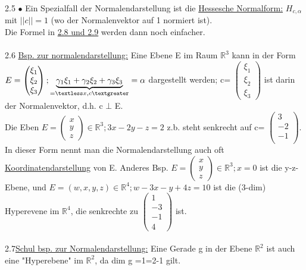 \documentclass[]{scrartcl}
\begin{document}
 2.5 $\bullet$ Ein Spezialfall der Normalendarstellung ist die \ul{Hessesche Normalform:} $H_{c,\alpha}$ mit \ul{$||c|| = 1$} (wo der Normalenvektor auf 1 normiert ist).\\
 Die Formel in  \ul{2.8 und 2.9} werden dann noch einfacher.\\\\
 2.6 \underline{Bsp. zur normalendarstellung:} Eine Ebene E im Raum $\mathbb{R}^3$ kann in der Form $E = {\begin{pmatrix} 
 		\xi_1\\
 		\xi_2\\
 		\xi_3
 \end{pmatrix}; \underbrace{\gamma_1\xi_1+\gamma_2\xi_2+\gamma_3\xi_3}_{=\textless x,c \textgreater}= \alpha}$ dargestellt werden; c= 
$\begin{pmatrix} 
	\xi_1\\
	\xi_2\\
	\xi_3
\end{pmatrix}$ ist darin der Normalenvektor, d.h. c $\bot$ E.\\
Die Eben $E = {\begin{pmatrix} 
		x\\
		y\\
		z
\end{pmatrix}\in \mathbb{R}^3; 3x-2y-z=2}$ z.b. steht senkrecht auf c= $\begin{pmatrix} 
3\\
-2\\
-1\\
\end{pmatrix}$.\\
In dieser Form nennt man die Normalendarstellung auch oft \ul{Koordinatendarstellung} von E. Anderes Bsp.  $E = {\begin{pmatrix} 
		x\\
		y\\
		z
	\end{pmatrix}\in \mathbb{R}^3; x=0}$ ist die y-z-Ebene, und  $E = {(w,x,y,z)\in \mathbb{R}^4; w-3x-y+4z=10}$ ist die (3-dim) Hyperevene im $\mathbb{R}^4$, die senkrechte zu $\begin{pmatrix}
	1\\
	-3\\
	-1\\
	4
\end{pmatrix}$ ist.\\
\\
2.7\underline{Schul bsp. zur Normalendarstellung:} Eine Gerade g in der Ebene $\mathbb{R}^2$ ist auch eine "Hyperebene" im $\mathbb{R}^2$, da dim g =1=2-1 gilt.\\
\end{document}
